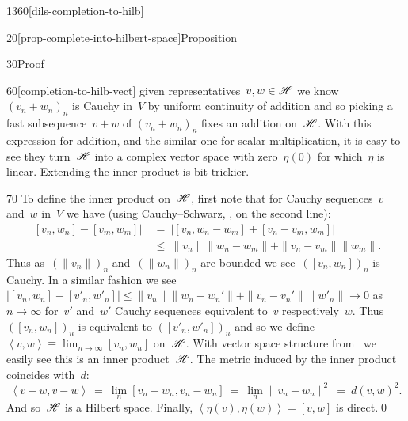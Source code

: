 \begin{parsec}{1360}[dils-completion-to-hilb]
\begin{point}{20}[prop-complete-into-hilbert-space]{Proposition}
\begin{point}{30}{Proof}
\begin{point}{60}[completion-to-hilb-vect]
    given representatives~$v,w \in \mathscr{H}$
    we know~$(v_n+w_n)_n$ is Cauchy in~$V$
    by uniform continuity of addition and so
    picking a fast subsequence~$v+w$ of $(v_n+w_n)_n$
        fixes an addition on~$\mathscr{H}$.
With this expression for addition, and the similar one for
    scalar multiplication, it is easy to see
    they turn~$\mathscr{H}$ into a complex vector space with zero~$\eta(0)$
    for which~$\eta$ is linear.
Extending the inner product is bit trickier.
\end{point}
\begin{point}{70}%
To define the inner product on~$\mathscr{H}$,
first note that for Cauchy sequences~$v$ and~$w$ in~$V$
we have (using Cauchy--Schwarz, , on the second line):
\begin{align*}
    \bigl|[v_n,w_n] - [v_m,w_m]\bigr|
    & \ =\  \bigl|[v_n,w_n-w_m] + [v_n - v_m,w_m]\bigr| \\
    & \ \leq\  \|v_n\| \|w_n - w_m\| + \|v_n-v_m\|\|w_m\|.
\end{align*}
Thus as~$(\|v_n\|)_n$ and~$(\|w_n\|)_n$ are bounded
we see~$([v_n,w_n])_n$ is Cauchy.
In a similar fashion we see~$\bigl|[v_n,w_n] - [v'_n,w'_n]\bigr|
    \leq \|v_n\| \|w_n - w_n'\| + \|v_n-v_n'\|\|w'_n\|\to 0$ as~$n\to \infty$
    for~$v'$ and~$w'$ Cauchy sequences equivalent
to~$v$ respectively~$w$.
Thus
$([v_n,w_n])_n$ is equivalent to
$([v'_n,w'_n])_n$
    and so
    we define~$\left<v,w\right>
        \equiv \lim_{n\to \infty} [v_n,w_n]$ on~$\mathscr{H}$.
With vector space structure from~
we easily see this is an inner product~$\mathscr{H}$.
The metric induced by the inner product coincides with~$d$:
\begin{equation*}
    \left<v-w,v-w\right>
   \ =\ \lim_{n}[v_n-w_n,v_n-w_n]
    \ =\ \lim_{n}\|v_n-w_n\|^2
    \ =\  d(v,w)^2.
\end{equation*}
And so~$\mathscr{H}$ is a Hilbert space.
Finally, $\left<\eta(v),\eta(w)\right>=[v,w]$ is direct.\qed
\end{point}
\end{point}
\end{point}
\end{parsec}

